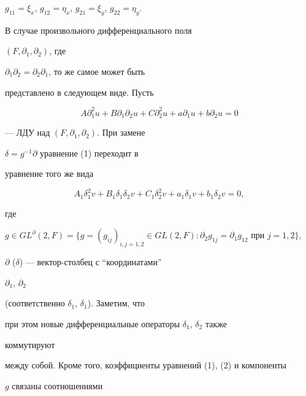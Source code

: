 $g_{11}=\xi_x$, $g_{12}=\eta_x$, $g_{21}=\xi_y$, $g_{22}=\eta_y$. 


 


В случае произвольного дифференциального поля 


$(F,\partial_1,\partial_2)$, где  


$\partial_1\partial_2=\partial_2\partial_1$, то же самое может быть 


представлено в следующем виде. Пусть 


\begin{equation} 


A\partial^2_1u+B\partial_1\partial_2u+C\partial^2_2u+ 


a\partial_1u+b\partial_2u=0 


\end{equation} 


--- ЛДУ над $(F,\partial_1,\partial_2)$. При замене 


$\delta=g^{-1}\partial$ уравнение (1) переходит в  


уравнение того же вида 


\begin{equation} 


A_1\delta^2_1v+B_1\delta_1\delta_2v+C_1\delta^2_2v+ 


a_1\delta_1v+b_1\delta_2v=0, 


\end{equation} 


где  


$g\in GL^\partial(2,F)=\{g=(g_{ij})_{i,j=1,2}\in 


GL(2,F):\partial_2g_{1j}=\partial_1g_{12}\text{ при }j=1,2\}$, 


$\partial$ ($\delta$) --- вектор-столбец с ``координатами'' 


$\partial_1$, $\partial_2$ 


(соответственно $\delta_1$, $\delta_1$). Заметим, что  


при этом новые дифференциальные операторы $\delta_1$, $\delta_2$ также 


коммутируют  


между собой. Кроме того, коэффициенты уравнений (1), (2) и компоненты  


$g$ связаны соотношениями 


